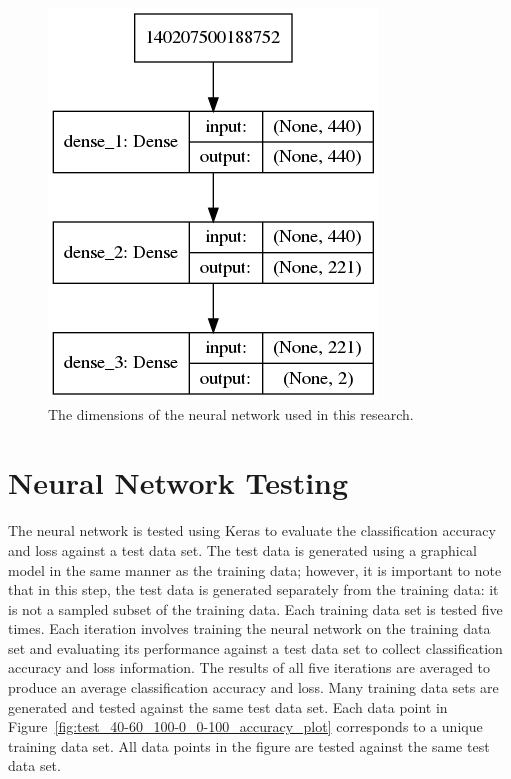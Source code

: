 \documentclass[]{report}
\begin{document}
\begin{figure}[h]
    \centering
    \includegraphics[scale=0.5]{figures/neural_network_model.png}
    \caption[]{The dimensions of the neural network used in this research.}
    \label{fig:neural_network_model}
\end{figure}

\FloatBarrier
\section{Neural Network Testing}

The neural network is tested using Keras to evaluate the classification accuracy and loss against a
test data set. The test data is generated using a graphical model in the same manner as the training
data; however, it is important to note that in this step, the test data is generated separately from
the training data: it is not a sampled subset of the training data. Each training data set is tested
five times. Each iteration involves training the neural network on the training data set and
evaluating its performance against a test data set to collect classification accuracy and loss
information. The results of all five iterations are averaged to produce an average classification
accuracy and loss. Many training data sets are generated and tested against the same test data set.
Each data point in Figure~\ref{fig:test_40-60_100-0_0-100_accuracy_plot} corresponds to a unique
training data set. All data points in the figure are tested against the same test data set.
\end{document}
